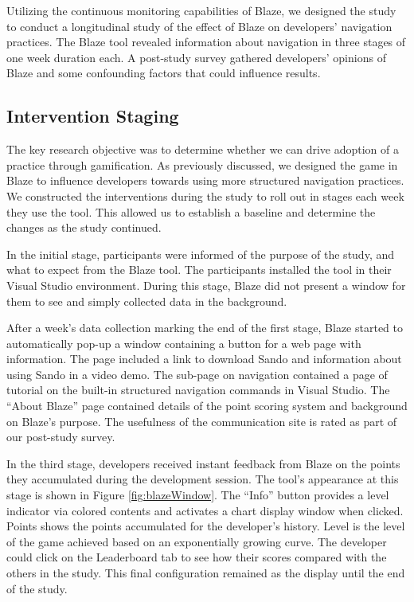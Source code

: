 \documentclass{sig-alternate}
\begin{document}
Utilizing the continuous monitoring capabilities of Blaze, we designed the study to conduct a longitudinal study of the effect of Blaze on developers' navigation practices.  The Blaze tool revealed information about navigation in three stages of one week duration each.  A post-study survey gathered developers' opinions of Blaze and some confounding factors that could influence results.

\subsection{Intervention Staging}

The key research objective was to determine whether we can drive adoption of a practice through gamification.  As previously discussed, we designed the game in Blaze to influence developers towards using more structured navigation practices.  We constructed the interventions during the study to roll out in stages each week they use the tool.  This allowed us to establish a baseline and determine the changes as the study continued.

In the initial stage, participants were informed of the purpose of the study, and what to expect from the Blaze tool.  The participants installed the tool in their Visual Studio environment.  During this stage, Blaze did not present a window for them to see and simply collected data in the background.   

After a week's data collection marking the end of the first stage, Blaze started to automatically pop-up a window containing a button for a web page with information.  The page included a link to download Sando  and information about using Sando in a video demo.  The sub-page on navigation contained a page of tutorial on the built-in structured navigation commands in Visual Studio.  The ``About Blaze'' page contained details of the point scoring system and background on Blaze's purpose.  The usefulness of the communication site is rated as part of our post-study  survey.

In the third stage, developers received instant feedback from Blaze on the points they accumulated during the development session.  The tool's appearance at this stage is shown in Figure \ref{fig:blazeWindow}.  The ``Info'' button provides a level indicator via colored contents and activates a chart display window when clicked.  Points shows the points accumulated for the developer's history.  Level is the level of the game achieved based on an exponentially growing curve.   The developer could click on the Leaderboard tab to see how their scores compared with the others in the study.  This final configuration remained as the display until the end of the study.  
\end{document}
